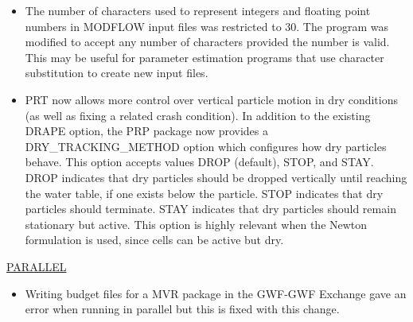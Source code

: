 \begin{itemize}
		\item The number of characters used to represent integers and floating point numbers in MODFLOW input files was restricted to 30.  The program was modified to accept any number of characters provided the number is valid.  This may be useful for parameter estimation programs that use character substitution to create new input files.
		\item PRT now allows more control over vertical particle motion in dry conditions (as well as fixing a related crash condition). In addition to the existing DRAPE option, the PRP package now provides a DRY\_TRACKING\_METHOD option which configures how dry particles behave. This option accepts values DROP (default), STOP, and STAY. DROP indicates that dry particles should be dropped vertically until reaching the water table, if one exists below the particle. STOP indicates that dry particles should terminate. STAY indicates that dry particles should remain stationary but active. This option is highly relevant when the Newton formulation is used, since cells can be active but dry.
		
	\end{itemize}






	\underline{PARALLEL}
	\begin{itemize}
		\item Writing budget files for a MVR package in the GWF-GWF Exchange gave an error when running in parallel but this is fixed with this change.
	\end{itemize}

